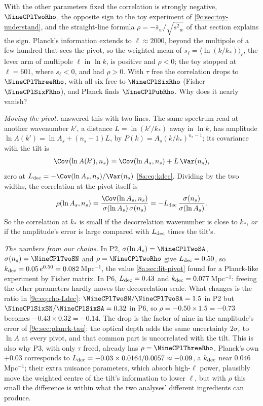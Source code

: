With the other parameters fixed the correlation is strongly negative, $\NineCPlTwoRho$, the opposite sign to the toy
experiment of \cref{9c:sec:toy-understand}, and the straight-line formula
$\rho=-\bar s_w/\sqrt{\overline{s^2}_w}$ of that section explains the sign. Planck's information extends to
$\ell\approx2000$, beyond the multipole of a few hundred that sees the pivot, so the weighted mean of
$s_\ell=\langle\ln(k/k_*)\rangle_\ell$, the lever arm of multipole $\ell$ in $\ln k$, is positive and $\rho<0$; the toy
stopped at $\ell=601$, where $s_\ell<0$, and had $\rho>0$. With $\tau$ free the correlation drops to $\NineCPlThreeRho$,
with all six free to $\NineCPlSixRho$ (Fisher $\NineCPlSixFRho$), and Planck finds $\NineCPlPubRho$. Why does it nearly
vanish?

\emph{Moving the pivot.}  answered this with two lines. The same spectrum read at another
wavenumber $k'$, a distance $L=\ln(k'/k_*)$ away in $\ln k$, has amplitude
$\ln A(k')=\ln A_s+(n_s-1)L$, by $P(k)=A_s(k/k_*)^{n_s-1}$; its covariance with the tilt is
\begin{equation}
  \Cov\bigl(\ln A(k'),n_s\bigr)=\Cov(\ln A_s,n_s)+L\,\Var(n_s),
\end{equation}
zero at $L_{\rm dec}=-\Cov(\ln A_s,n_s)/\Var(n_s)$ \eqref{8a:eq:kdec}. Dividing by the two widths, the correlation at
the pivot itself is
\begin{equation}
  \rho(\ln A_s,n_s)=\frac{\Cov(\ln A_s,n_s)}{\sigma(\ln A_s)\,\sigma(n_s)}=-L_{\rm dec}\,\frac{\sigma(n_s)}{\sigma(\ln A_s)} .
  \label{9c:eq:rho-Ldec}
\end{equation}
So the correlation at $k_*$ is small if the decorrelation wavenumber is close to $k_*$, \emph{or} if the amplitude's
error is large compared with $L_{\rm dec}$ times the tilt's.

\emph{The numbers from our chains.} In P2, $\sigma(\ln A_s)=\NineCPlTwoSA$, $\sigma(n_s)=\NineCPlTwoSN$ and
$\rho=\NineCPlTwoRho$ give $L_{\rm dec}=0.50$, so $k_{\rm dec}=0.05\,e^{0.50}=0.082$\,Mpc$^{-1}$, the value
\cref{8a:sec:lit-pivot} found for a Planck-like experiment by Fisher matrix. In P6, $L_{\rm dec}=0.43$ and
$k_{\rm dec}=0.077$\,Mpc$^{-1}$: freeing the other parameters hardly moves the decorrelation scale. What changes is the
ratio in \eqref{9c:eq:rho-Ldec}: $\NineCPlTwoSN/\NineCPlTwoSA=1.5$ in P2 but $\NineCPlSixSN/\NineCPlSixSA=0.32$ in P6, so
$\rho=-0.50\times1.5=-0.73$ becomes $-0.43\times0.32=-0.14$. The drop is the factor of nine in the amplitude's error of
\cref{9c:sec:planck-tau}: the optical depth adds the same uncertainty $2\sigma_\tau$ to $\ln A$ at every pivot, and that
common part is uncorrelated with the tilt. This is also why P3, with only $\tau$ freed, already has
$\rho=\NineCPlThreeRho$. Planck's own $+0.03$ corresponds to $L_{\rm dec}=-0.03\times0.0164/0.0057\approx-0.09$, a
$k_{\rm dec}$ near $0.046$\,Mpc$^{-1}$; their extra nuisance parameters, which absorb high-$\ell$ power, plausibly move the
weighted centre of the tilt's information to lower $\ell$, but with $\rho$ this small the difference is within what the
two analyses' different ingredients can produce.

